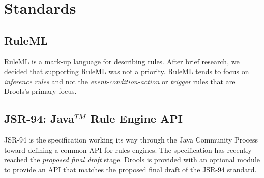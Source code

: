 \section{Standards}

\subsection{RuleML}

RuleML is a mark-up language for describing rules.  After brief
research, we decided that supporting RuleML was not a priority.
RuleML tends to focus on \emph{inference rules} and not the
\emph{event-condition-action} or \emph{trigger} rules that
are Drools's primary focus.

\subsection{JSR-94: Java$^{TM}$ Rule Engine API}

JSR-94 is the specification working its way through the Java Community
Process toward defining a common API for rules engines.  The
specification has recently reached the \emph{proposed final draft}
stage.  Drools is provided with an optional module to provide an API
that matches the proposed final draft of the JSR-94 standard.

